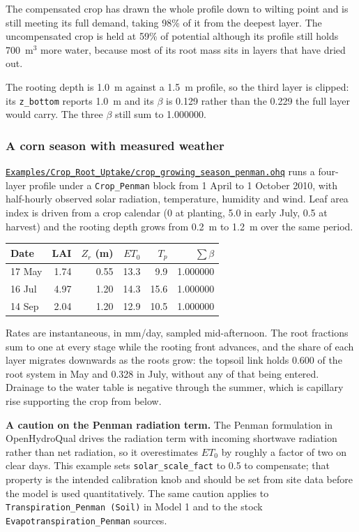 \documentclass[11pt,a4paper]{article}
\newcommand{\code}[1]{\texttt{\small #1}}
\newcommand{\file}[1]{\texttt{\small #1}}
\newcommand{\ghbase}{https://github.com/ArashMassoudieh/OpenHydroQual/blob/master}
\newcommand{\exfile}[1]{\href{\ghbase/#1}{\file{#1}}}
\begin{document}
The compensated crop has drawn the whole profile down to wilting point and is
still meeting its full demand, taking 98\% of it from the deepest layer. The
uncompensated crop is held at 59\% of potential although its profile still
holds 700~m$^3$ more water, because most of its root mass sits in layers that
have dried out.

The rooting depth is 1.0~m against a 1.5~m profile, so the third layer is
clipped: its \code{z\_bottom} reports 1.0~m and its $\beta$ is 0.129 rather
than the 0.229 the full layer would carry. The three $\beta$ still sum to
1.000000.

\subsubsection*{A corn season with measured weather}

\exfile{Examples/Crop\_Root\_Uptake/crop\_growing\_season\_penman.ohq} runs a
four-layer profile under a \code{Crop\_Penman} block from 1 April to 1 October
2010, with half-hourly observed solar radiation, temperature, humidity and wind.
Leaf area index is driven from a crop calendar (0 at planting, 5.0 in early
July, 0.5 at harvest) and the rooting depth grows from 0.2~m to 1.2~m over the
same period.

\begin{center}
\begin{tabular}{@{}lrrrrr@{}}
\toprule
\textbf{Date} & \textbf{LAI} & \textbf{$Z_r$ (m)} & \textbf{$ET_0$} & \textbf{$T_p$} & \textbf{$\sum\beta$} \\
\midrule
17 May & 1.74 & 0.55 & 13.3 & \phantom{0}9.9 & 1.000000 \\
16 Jul & 4.97 & 1.20 & 14.3 & 15.6 & 1.000000 \\
14 Sep & 2.04 & 1.20 & 12.9 & 10.5 & 1.000000 \\
\bottomrule
\end{tabular}
\end{center}

\noindent
Rates are instantaneous, in mm/day, sampled mid-afternoon. The root fractions
sum to one at every stage while the rooting front advances, and the share of
each layer migrates downwards as the roots grow: the topsoil link holds 0.600
of the root system in May and 0.328 in July, without any of that being entered.
Drainage to the water table is negative through the summer, which is capillary
rise supporting the crop from below.

\medskip
\noindent
\textbf{A caution on the Penman radiation term.} The Penman formulation in
OpenHydroQual drives the radiation term with incoming shortwave radiation rather
than net radiation, so it overestimates $ET_0$ by roughly a factor of two on
clear days. This example sets \code{solar\_scale\_fact} to 0.5 to compensate;
that property is the intended calibration knob and should be set from site data
before the model is used quantitatively. The same caution applies to
\code{Transpiration\_Penman (Soil)} in Model 1 and to the stock
\code{Evapotranspiration\_Penman} sources.
\end{document}
